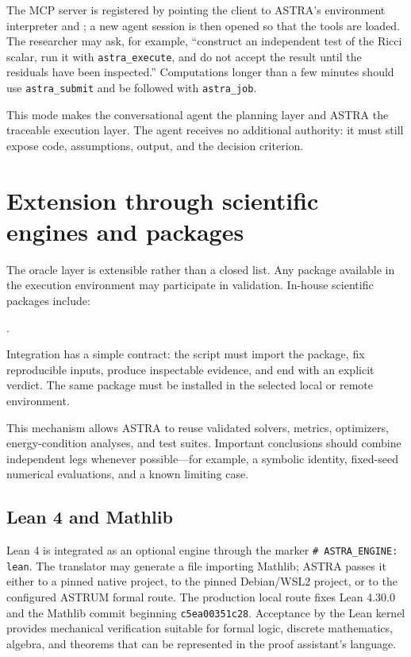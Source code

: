 \documentclass[11pt,a4paper]{article}
\begin{document}
The MCP server is registered by pointing the client to ASTRA's environment interpreter and ; a new agent session is then opened so that the tools are loaded. The researcher may ask, for example, ``construct an independent test of the Ricci scalar, run it with \texttt{astra\_execute}, and do not accept the result until the residuals have been inspected.'' Computations longer than a few minutes should use \texttt{astra\_submit} and be followed with \texttt{astra\_job}.

This mode makes the conversational agent the planning layer and ASTRA the traceable execution layer. The agent receives no additional authority: it must still expose code, assumptions, output, and the decision criterion.

\section{Extension through scientific engines and packages}

The oracle layer is extensible rather than a closed list. Any package available in the execution environment may participate in validation. In-house scientific packages include:

\begin{center}
\quad {}\quad {}.
\end{center}

Integration has a simple contract: the script must import the package, fix reproducible inputs, produce inspectable evidence, and end with an explicit verdict. The same package must be installed in the selected local or remote environment.

This mechanism allows ASTRA to reuse validated solvers, metrics, optimizers, energy-condition analyses, and test suites. Important conclusions should combine independent legs whenever possible---for example, a symbolic identity, fixed-seed numerical evaluations, and a known limiting case.

\subsection{Lean 4 and Mathlib}

Lean 4 is integrated as an optional engine through the marker \texttt{\# ASTRA\_ENGINE: lean}. The translator may generate a file importing Mathlib; ASTRA passes it either to a pinned native project, to the pinned Debian/WSL2 project, or to the configured ASTRUM formal route. The production local route fixes Lean 4.30.0 and the Mathlib commit beginning \texttt{c5ea00351c28}. Acceptance by the Lean kernel provides mechanical verification suitable for formal logic, discrete mathematics, algebra, and theorems that can be represented in the proof assistant's language.
\end{document}
